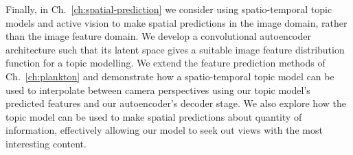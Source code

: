 Finally, in Ch.~\ref{ch:spatial-prediction} we consider using spatio-temporal topic models and active vision to make spatial predictions in the image domain, rather than the image feature domain. We develop a convolutional autoencoder architecture such that its latent space gives a suitable image feature distribution function for a topic modelling. We extend the feature prediction methods of Ch.~\ref{ch:plankton} and demonstrate how a spatio-temporal topic model can be used to interpolate between camera perspectives using our topic model's predicted features and our autoencoder's decoder stage. We also explore how the topic model can be used to make spatial predictions about quantity of information, effectively allowing our model to seek out views with the most interesting content.
